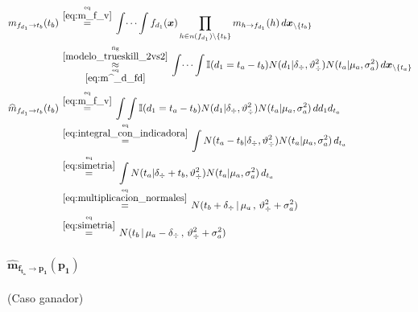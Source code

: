 \documentclass[article]{jss}
\newcommand\hfrac[2]{\genfrac{}{}{0pt}{}{#1}{#2}} %
\begin{document}
\begin{appendix}
\begin{equation}\label{eq:^m_fd_tb}
\begin{split}
m_{f_{d_1} \rightarrow t_b}(t_b) & \overset{\hfrac{\text{eq}}{\ref{eq:m_f_v}}}{=} \int \dots \int f_{d_1}(\bm{x}) \prod_{h \in n(f_{d_1}) \setminus \{t_b\} } m_{h \rightarrow f_{d_1}}(h) \, d\bm{x}_{\setminus \{t_b\} }  \\
&\overset{\hfrac{\text{fig}}{\ref{modelo_trueskill_2vs2}}}{\underset{\hfrac{\text{eq}}{\ref{eq:m^_d_fd}}}{\approx}}  \int \dots \int \mathbb{I}(d_1 = t_a - t_b) N(d_1 | \delta_{\div}, \vartheta_{\div}^2) N(t_a | \mu_a , \sigma_a^2 )  \, d\bm{x}_{\setminus \{t_a\} } \\[0.1cm]
\widehat{m}_{f_{d_1} \rightarrow t_b}(t_b)  & \overset{\hfrac{\text{eq}}{\ref{eq:m_f_v}}}{=} \int \int \mathbb{I}(d_1 = t_a - t_b) N(d_1 | \delta_{\div}, \vartheta_{\div}^2) N(t_a | \mu_a , \sigma_a^2 )  \, d{d_1} d_{t_a} \\
& \overset{\hfrac{\text{eq}}{\ref{eq:integral_con_indicadora}}}{=} \int  N(t_a - t_b | \delta_{\div}, \vartheta_{\div}^2) N(t_a | \mu_a , \sigma_a^2 )  \, d_{t_a} \\
& \overset{\hfrac{\text{eq}}{\ref{eq:simetria}}}{=} \int  N( t_a | \delta_{\div} + t_b, \vartheta_{\div}^2) N(t_a | \mu_a , \sigma_a^2 )  \, d_{t_a} \\
& \overset{\hfrac{\text{eq}}{\ref{eq:multiplicacion_normales}}}{=} N(t_b + \delta_{\div} \, | \, \mu_a \, , \, \vartheta_{\div}^2 + \sigma_a^2) \\
& \overset{\hfrac{\text{eq}}{\ref{eq:simetria}}}{=} N(t_b \, | \, \mu_a - \delta_{\div} \, , \, \vartheta_{\div}^2 + \sigma_a^2) \\
\end{split}
\end{equation}

\paragraph{$\bm{\widehat{m}_{f_{t_a} \rightarrow p_1}(p_1)}$} (Caso ganador)


\end{appendix}
\end{document}
